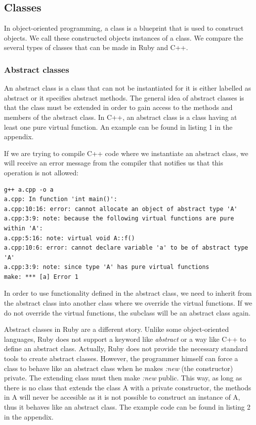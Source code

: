 \documentclass[10pt,a4paper,twocolumn]{article}
\begin{document}
\subsection{Classes}
In object-oriented programming, a class is a blueprint that is used to construct objects. We call these constructed objects instances of a class. We compare the several types of classes that can be made in Ruby and C++.

\subsubsection{Abstract classes}
An abstract class is a class that can not be instantiated for it is either labelled as abstract or it specifies abstract methods. The general idea of abstract classes is that the class must be extended in order to gain access to the methods and members of the abstract class. In C++, an abstract class is a class having at least one pure virtual function. An example can be found in listing 1 in the appendix.

If we are trying to compile C++ code where we instantiate an abstract class, we will receive an error message from the compiler that notifies us that this operation is not allowed:

\begin{lstlisting}
g++ a.cpp -o a
a.cpp: In function 'int main()':
a.cpp:10:16: error: cannot allocate an object of abstract type 'A'
a.cpp:3:9: note: because the following virtual functions are pure within 'A':
a.cpp:5:16: note: virtual void A::f()
a.cpp:10:6: error: cannot declare variable 'a' to be of abstract type 'A'
a.cpp:3:9: note: since type 'A' has pure virtual functions
make: *** [a] Error 1
\end{lstlisting}

In order to use functionality defined in the abstract class, we need to inherit from the abstract class into another class where we override the virtual functions. If we do not override the virtual functions, the subclass will be an abstract class again.

Abstract classes in Ruby are a different story. Unlike some object-oriented languages, Ruby does not support a keyword like \textit{abstract} or a way like C++ to define an abstract class. Actually, Ruby does not provide the necessary standard tools to create abstract classes. However, the programmer himself can force a class to behave like an abstract class when he makes \textit{:new} (the constructor) private. The extending class must then make \textit{:new} public. This way, as long as there is no class that extends the class A with a private constructor, the methods in A will never be accesible as it is not possible to construct an instance of A, thus it behaves like an abstract class. The example code can be found in listing 2 in the appendix.
\end{document}
